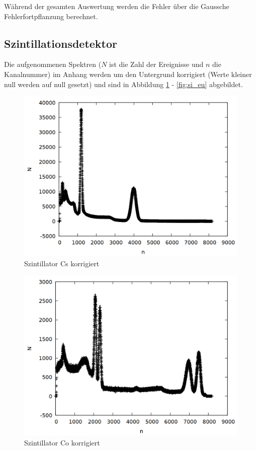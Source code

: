 Während der gesamten Auswertung werden die Fehler über die Gaussche Fehlerfortpflanzung berechnet.

\subsection{Szintillationsdetektor}
Die aufgenommenen Spektren ($N$ ist die Zahl der Ereignisse und $n$ die Kanalnummer) im Anhang werden um den Untergrund korrigiert (Werte kleiner null werden auf null gesetzt) und sind in Abbildung \ref{fig:si_cs} - \ref{fig:si_eu} abgebildet. 

\begin{figure}[h]
\centering
\includegraphics[width=0.7\linewidth]{data/si_cs.png}
\caption{Szintillator Cs korrigiert}
\label{fig:si_cs}
\end{figure}

\newpage

\begin{figure}[h]
\centering
\includegraphics[width=0.7\linewidth]{data/si_co.png}
\caption{Szintillator Co korrigiert}
\label{fig:si_co}
\end{figure}

